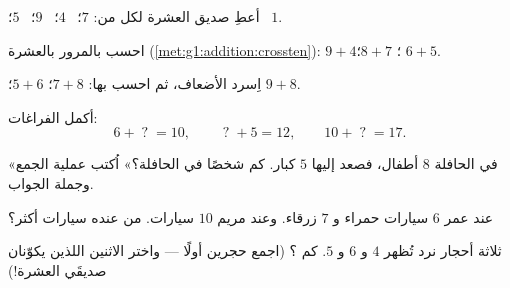 \begin{exercise}[$\star$]\label{exo:g1:addition:3}
أعطِ صديق العشرة لكل من: $7$؛ \ $4$؛ \ $9$؛ \ $5$؛ \ $1$.
\end{exercise}

\begin{exercise}[$\star$]\label{exo:g1:addition:4}
احسب بالمرور بالعشرة (\cref{met:g1:addition:crossten}):
$9 + 4$؛ \quad $8 + 7$؛ \quad $6 + 5$.
\end{exercise}

\begin{exercise}[$\star$]\label{exo:g1:addition:5}
اِسرد الأضعاف، ثم احسب بها: $7 + 8$؛ \quad
$5 + 6$؛ \quad $9 + 8$.
\end{exercise}

\begin{exercise}[$\star$]\label{exo:g1:addition:6}
أكمل الفراغات:
\[
6 + \;?\; = 10, \qquad
\;?\; + 5 = 12, \qquad
10 + \;?\; = 17 .
\]
\end{exercise}

\begin{exercise}[$\star$]\label{exo:g1:addition:7}
«في الحافلة $8$ أطفال، فصعد إليها $5$ كبار. كم شخصًا في
الحافلة؟» اُكتب عملية الجمع وجملة الجواب.
\end{exercise}

\begin{exercise}[$\star$]\label{exo:g1:addition:8}
عند عمر $6$ سيارات حمراء و $7$ زرقاء. وعند مريم $10$ سيارات. من
عنده سيارات أكثر؟
\end{exercise}

\begin{exercise}[$\star\star$]\label{exo:g1:addition:9}
ثلاثة أحجار نرد تُظهر $4$ و $6$ و $5$. كم ؟ (اجمع حجرين
أولًا --- واختر الاثنين اللذين يكوّنان صديقَي العشرة!)
\end{exercise}
